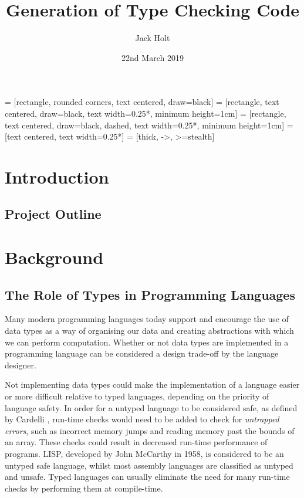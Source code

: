 \documentclass{UoYCSproject}
\title{Generation of Type Checking Code}
\author{Jack Holt}
\date{22nd March 2019}
\begin{document}
 = [rectangle, rounded corners, text centered, draw=black]
 = [rectangle, text centered, draw=black,
text width=0.25*\columnwidth, minimum height=1cm]
 = [rectangle, text centered, draw=black, dashed,
text width=0.25*\columnwidth, minimum height=1cm]
 = [text centered, text width=0.25*\columnwidth]
 = [thick, ->, >=stealth]

\maketitle
\listoffigures
{}

\begin{summary}
\end{summary}

\chapter{Introduction}

\section{Project Outline}

\chapter{Background}

\section{The Role of Types in Programming Languages}
Many modern programming languages today support and encourage the use of data
types as a way of organising our data and creating abstractions with which
we can perform computation. Whether or not data types are implemented in a
programming language can be considered a design trade-off by the language
designer.

Not implementing data types could make the implementation of a language easier
or more difficult relative to typed languages, depending on the priority of
language safety. In order for a untyped language to be considered safe, as
defined by Cardelli \cite[p.~3]{CSHandbook}, run-time checks would need to be added
to check for \textit{untrapped errors}, such as incorrect memory jumps and
reading memory past the bounds of an array. These checks could result in
decreased run-time performance of programs. LISP, developed by John McCarthy in
1958, is considered to be an untyped safe language, whilst most assembly
languages are classified as untyped and unsafe. Typed languages can usually
eliminate the need for many run-time checks by performing them at compile-time.
\end{document}
